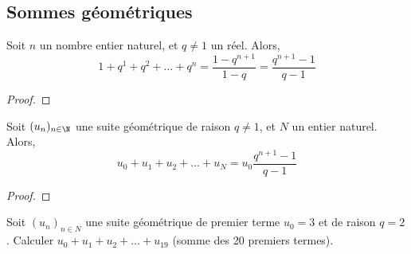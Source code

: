 \documentclass{article}
\begin{document}
\newpage
\subsection{Sommes géométriques}
\begin{tcolorbox}
\begin{proposition}
Soit $n$ un nombre entier naturel, et $q \neq 1$ un réel. Alors,
\begin{equation*}
1 + q^1 + q^2 + \dots + q^n = \dfrac{1 - q^{n+1}}{1 - q} = \dfrac{q^{n+1} - 1}{q - 1}
\end{equation*}
\end{proposition}
\end{tcolorbox}
\begin{proof}
\hfill

\vspace{0.2cm}
\emptybox{5cm}
\end{proof}
\begin{proposition}
Soit $(u_n)_{n \in \N}$ une suite géométrique de raison $q \neq 1$, et $N$ un entier naturel. Alors,
\begin{equation*}
u_0 + u_1 + u_2 + \dots + u_N = u_0 \dfrac{q^{n+1} - 1}{q - 1}
\end{equation*}
\end{proposition}
\begin{proof}
\hfill

\vspace{0.2cm}
\emptybox{5cm}
\end{proof}
\begin{example}
Soit $(u_n)_{n \in N}$ une suite géométrique de premier terme $u_0 = 3$ et de raison $q = 2$. Calculer $u_0 + u_1 + u_2 + \dots + u_{19}$ (somme des 20 premiers termes).

\vspace*{0.2cm}
\emptybox{3cm}
\end{example}
\end{document}
